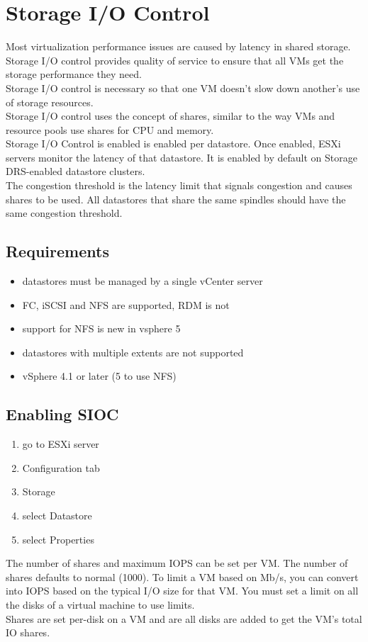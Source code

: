 \section{Storage I/O Control}

Most virtualization performance issues are caused by latency in shared
storage. Storage I/O control provides quality of service to ensure that all
VMs get the storage performance they need.\\

Storage I/O control is necessary so that one VM doesn't slow down another's
use of storage resources.\\

Storage I/O control uses the concept of shares, similar to the way VMs
and resource pools use shares for CPU and memory.\\

Storage I/O Control is enabled is enabled per datastore. Once enabled, ESXi
servers monitor the latency of that datastore. It is enabled by default on
Storage DRS-enabled datastore clusters.\\

The congestion threshold is the latency limit that signals congestion and
causes shares to be used. All datastores that share the same spindles should
have the same congestion threshold.
 
\subsection{Requirements}

\begin{itemize}
\item datastores must be managed by a single vCenter server
\item FC, iSCSI and NFS are supported, RDM is not
\item support for NFS is new in vsphere 5
\item datastores with multiple extents are not supported
\item vSphere 4.1 or later (5 to use NFS)
\end{itemize}

\subsection{Enabling SIOC}

\begin{enumerate}
\item go to ESXi server
\item Configuration tab
\item Storage
\item select Datastore
\item select Properties
\end{enumerate}

The number of shares and maximum IOPS can be set per VM. The number of shares
defaults to normal (1000). To limit a VM based on Mb/s, you can convert into
IOPS based on the typical I/O size for that VM. You must set a limit on all
the disks of a virtual machine to use limits.\\

Shares are set per-disk on a VM and are all disks are added to get the VM's
total IO shares.
